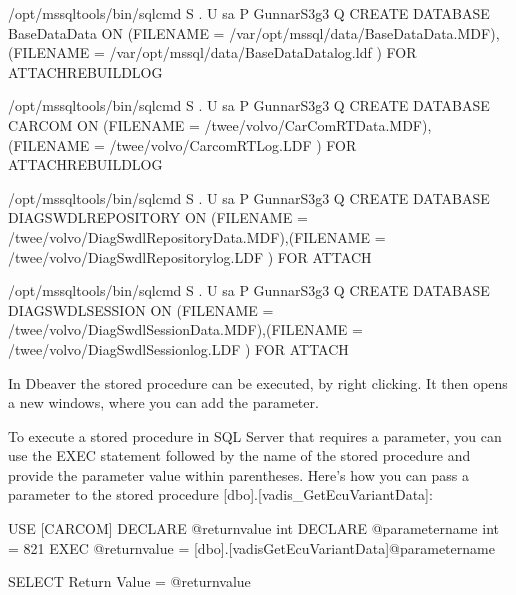 \documentclass[letterpaper,10pt,english]{sphinxmanual}
\begin{document}
\begin{sphinxVerbatim}[commandchars=\\\{\}]
/opt/mssql\PYGZhy{}tools/bin/sqlcmd \PYGZhy{}S . \PYGZhy{}U sa \PYGZhy{}P GunnarS3g3 \PYGZhy{}Q \PYGZdq{}CREATE DATABASE BaseData\PYGZus{}Data ON (FILENAME = \PYGZsq{}/var/opt/mssql/data/BaseData\PYGZus{}Data.MDF\PYGZsq{}),(FILENAME = \PYGZsq{}/var/opt/mssql/data/BaseData\PYGZus{}Data\PYGZus{}log.ldf\PYGZsq{} ) FOR ATTACH\PYGZus{}REBUILD\PYGZus{}LOG\PYGZdq{}

/opt/mssql\PYGZhy{}tools/bin/sqlcmd \PYGZhy{}S . \PYGZhy{}U sa \PYGZhy{}P GunnarS3g3 \PYGZhy{}Q \PYGZdq{}CREATE DATABASE CARCOM ON (FILENAME = \PYGZsq{}/twee/volvo/CarComRT\PYGZus{}Data.MDF\PYGZsq{}),(FILENAME = \PYGZsq{}/twee/volvo/CarcomRT\PYGZus{}Log.LDF\PYGZsq{} ) FOR ATTACH\PYGZus{}REBUILD\PYGZus{}LOG\PYGZdq{}

/opt/mssql\PYGZhy{}tools/bin/sqlcmd \PYGZhy{}S . \PYGZhy{}U sa \PYGZhy{}P GunnarS3g3 \PYGZhy{}Q \PYGZdq{}CREATE DATABASE DIAGSWDLREPOSITORY ON (FILENAME = \PYGZsq{}/twee/volvo/DiagSwdlRepository\PYGZus{}Data.MDF\PYGZsq{}),(FILENAME = \PYGZsq{}/twee/volvo/DiagSwdlRepository\PYGZus{}log.LDF \PYGZsq{} ) FOR ATTACH\PYGZdq{}

/opt/mssql\PYGZhy{}tools/bin/sqlcmd \PYGZhy{}S . \PYGZhy{}U sa \PYGZhy{}P GunnarS3g3 \PYGZhy{}Q \PYGZdq{}CREATE DATABASE DIAGSWDLSESSION ON (FILENAME = \PYGZsq{}/twee/volvo/DiagSwdlSession\PYGZus{}Data.MDF\PYGZsq{}),(FILENAME = \PYGZsq{}/twee/volvo/DiagSwdlSession\PYGZus{}log.LDF\PYGZsq{} ) FOR ATTACH\PYGZdq{}
\end{sphinxVerbatim}

\sphinxAtStartPar
In Dbeaver the stored procedure can be executed, by right clicking.
It then opens a new windows, where you can add the parameter.

\sphinxAtStartPar
To execute a stored procedure in SQL Server that requires a parameter, you can use the EXEC statement followed by the name of the stored procedure and provide the parameter value within parentheses. Here’s how you can pass a parameter to the stored procedure {[}dbo{]}.{[}vadis\_GetEcuVariantData{]}:

\begin{sphinxVerbatim}[commandchars=\\\{\}]
USE [CARCOM]
DECLARE @return\PYGZus{}value int
DECLARE @parameter\PYGZus{}name int = 821
EXEC @return\PYGZus{}value = [dbo].[vadis\PYGZus{}GetEcuVariantData]@parameter\PYGZus{}name

SELECT       \PYGZsq{}Return Value\PYGZsq{} = @return\PYGZus{}value
\end{sphinxVerbatim}
\end{document}
